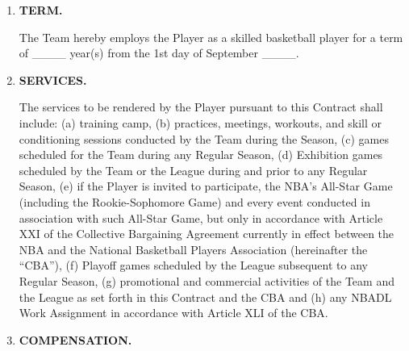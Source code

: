 \documentclass[
]{book}
\begin{document}
\begin{enumerate}
\def\labelenumi{\arabic{enumi}.}
\item
  \textbf{TERM.}

  The Team hereby employs the Player as a skilled basketball player for a term of \_\_\_\_ year(s) from the 1st day of September \_\_\_\_.
\item
  \textbf{SERVICES.}

  The services to be rendered by the Player pursuant to this Contract shall include: (a) training camp, (b) practices, meetings, workouts, and skill or conditioning sessions conducted by the Team during the Season, (c) games scheduled for the Team during any Regular Season, (d) Exhibition games scheduled by the Team or the League during and prior to any Regular Season, (e) if the Player is invited to participate, the NBA's All-Star Game (including the Rookie-Sophomore Game) and every event conducted in association with such All-Star Game, but only in accordance with Article XXI of the Collective Bargaining Agreement currently in effect between the NBA and the National Basketball Players Association (hereinafter the ``CBA''), (f) Playoff games scheduled by the League subsequent to any Regular Season, (g) promotional and commercial activities of the Team and the League as set forth in this Contract and the CBA and (h) any NBADL Work Assignment in accordance with Article XLI of the CBA.
\item
  \textbf{COMPENSATION.}
\end{enumerate}
\end{document}
